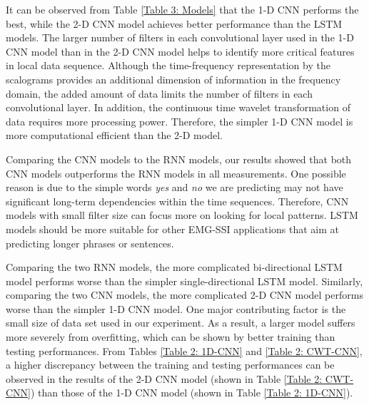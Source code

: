 \documentclass{article}
\begin{document}
It can be observed from Table \ref{Table 3: Models} that the 1-D CNN performs the best, while the 2-D CNN model achieves better performance than the LSTM models. The larger number of filters in each convolutional layer used in the 1-D CNN model than in the 2-D CNN model helps to identify more critical  features in local data sequence. Although the time-frequency representation by the scalograms provides an additional dimension of information in the frequency domain, the added amount of data limits the number of filters in each convolutional layer. In addition, the continuous time wavelet transformation of data requires more processing power. Therefore, the simpler 1-D CNN model is more computational efficient than the 2-D model. 

Comparing the CNN models to the RNN models, our results showed that both CNN models outperforms the RNN models in all measurements. One possible reason is due to the simple words \textit{yes} and \textit{no} we are predicting may not have significant long-term dependencies within the time sequences. Therefore, CNN models with small filter size can focus more on looking for local patterns. LSTM models should be more suitable for other EMG-SSI applications that aim at predicting longer phrases or sentences.

Comparing the two RNN models, the more complicated bi-directional LSTM model performs worse than the simpler single-directional LSTM model.  Similarly, comparing the two CNN models, the more complicated 2-D CNN model performs worse than the simpler 1-D CNN model. One major contributing factor is the small size of data set used in our experiment. As a result, a larger model suffers more severely from overfitting, which can be shown by better training than testing performances. From Tables \ref{Table 2: 1D-CNN} and \ref{Table 2: CWT-CNN}, a higher discrepancy between the training and testing performances can be observed in the results of the 2-D CNN model (shown in Table \ref{Table 2: CWT-CNN}) than those of the 1-D CNN model (shown in Table \ref{Table 2: 1D-CNN}).  

\end{document}
